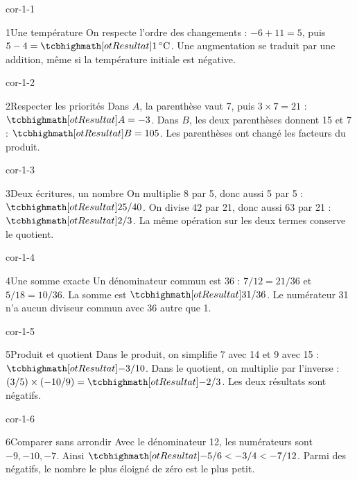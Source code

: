 \clearpage\pagestyle{otMain}\fontsize{11}{15}\selectfont{}
\begin{blocLivre}{cor-1-1}\begin{corrige}{1}{Une température}
On respecte l’ordre des changements : $-6+11=5$, puis $5-4=\res{1\,^\circ\mathrm C}$. Une augmentation se traduit par une addition, même si la température initiale est négative.
\end{corrige}\end{blocLivre}
\begin{blocLivre}{cor-1-2}\begin{corrige}{2}{Respecter les priorités}
Dans $A$, la parenthèse vaut 7, puis $3\times7=21$ : $\res{A=-3}$. Dans $B$, les deux parenthèses donnent 15 et 7 : $\res{B=105}$. Les parenthèses ont changé les facteurs du produit.
\end{corrige}\end{blocLivre}
\begin{blocLivre}{cor-1-3}\begin{corrige}{3}{Deux écritures, un nombre}
On multiplie 8 par 5, donc aussi 5 par 5 : $\res{25/40}$. On divise 42 par 21, donc aussi 63 par 21 : $\res{2/3}$. La même opération sur les deux termes conserve le quotient.
\end{corrige}\end{blocLivre}
\begin{blocLivre}{cor-1-4}\begin{corrige}{4}{Une somme exacte}
Un dénominateur commun est 36 : $7/12=21/36$ et $5/18=10/36$. La somme est $\res{31/36}$. Le numérateur 31 n’a aucun diviseur commun avec 36 autre que 1.
\end{corrige}\end{blocLivre}
\begin{blocLivre}{cor-1-5}\begin{corrige}{5}{Produit et quotient}
Dans le produit, on simplifie 7 avec 14 et 9 avec 15 : $\res{-3/10}$. Dans le quotient, on multiplie par l’inverse : $(3/5)\times(-10/9)=\res{-2/3}$. Les deux résultats sont négatifs.
\end{corrige}\end{blocLivre}
\begin{blocLivre}{cor-1-6}\begin{corrige}{6}{Comparer sans arrondir}
Avec le dénominateur 12, les numérateurs sont $-9,-10,-7$. Ainsi $\res{-5/6<-3/4<-7/12}$. Parmi des négatifs, le nombre le plus éloigné de zéro est le plus petit.
\end{corrige}\end{blocLivre}
